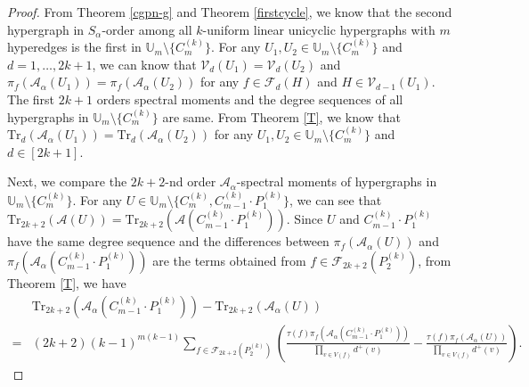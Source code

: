 \documentclass[10pt,a4paper]{amsart}
\begin{document}
\begin{proof}
From Theorem \ref{cgpn-g} and Theorem \ref{firstcycle}, we know that the second hypergraph in $S_{\alpha}$-order among all $k$-uniform linear unicyclic hypergraphs with $m$ hyperedges is the first in $\mathbb{U}_{m}\setminus\{C_{m}^{(k)}\}$.
For any $U_1, U_2\in\mathbb{U}_{m}\setminus\{C_{m}^{(k)}\}$ and $d=1,\ldots,2k+1$, we can know that $\mathcal{V}_{d}(U_1)=\mathcal{V}_{d}(U_2)$ and $\pi_{f}(\mathcal{A}_{\alpha}(U_1))=\pi_{f}(\mathcal{A}_{\alpha}(U_2))$ for any $f\in\mathcal{F}_{d}(H)$ and $H\in\mathcal{V}_{d-1}(U_1)$.
The first $2k+1$ orders spectral moments and the degree sequences of all hypergraphs in $\mathbb{U}_{m}\setminus\{C_{m}^{(k)}\}$ are same.
From Theorem \ref{T}, we know that $\mathrm{Tr}_{d}(\mathcal{A}_{\alpha}(U_1))=\mathrm{Tr}_{d}(\mathcal{A}_{\alpha}(U_2))$ for any $U_1, U_2\in\mathbb{U}_{m}\setminus\{C_{m}^{(k)}\}$ and $d\in[2k+1]$.

Next, we compare the $2k+2$-nd order $\mathcal{A}_{\alpha}$-spectral moments of hypergraphs in $\mathbb{U}_{m}\setminus\{C_{m}^{(k)}\}$.
For any $U\in\mathbb{U}_{m}\setminus\{C_{m}^{(k)},C_{m-1}^{(k)}\cdot P_{1}^{(k)}\}$, we can see that $\mathrm{Tr}_{2k+2}(\mathcal{A}(U))=\mathrm{Tr}_{2k+2}(\mathcal{A}(C_{m-1}^{(k)}\cdot P_{1}^{(k)}))$.
Since $U$ and $C_{m-1}^{(k)}\cdot P_{1}^{(k)}$ have the same degree sequence and the differences between $\pi_{f}(\mathcal{A}_{\alpha}(U))$ and $\pi_{f}(\mathcal{A}_{\alpha}(C_{m-1}^{(k)}\cdot P_{1}^{(k)}))$ are the terms obtained from $f\in\mathcal{F}_{2k+2}(P_2^{(k)})$, from Theorem \ref{T}, we have
\begin{align*}
&\mathrm{Tr}_{2k+2}(\mathcal{A}_{\alpha}(C_{m-1}^{(k)}\cdot P_{1}^{(k)}))-\mathrm{Tr}_{2k+2}(\mathcal{A}_{\alpha}(U))\\
=&(2k+2)(k-1)^{m(k-1)}\sum\limits_{f\in\mathcal{F}_{2k+2}(P_2^{(k)})}\left( \frac{\tau(f)\pi_{f}(\mathcal{A}_{\alpha}(C_{m-1}^{(k)}\cdot P_{1}^{(k)}))}{\prod\limits_{v\in V(f)}d^{+}(v)} - \frac{\tau(f)\pi_{f}(\mathcal{A}_{\alpha}(U))}{\prod\limits_{v\in V(f)}d^{+}(v)} \right).
\end{align*}


\end{proof}
\end{document}
